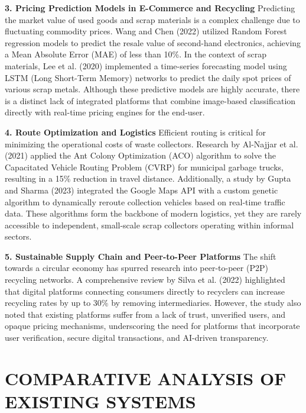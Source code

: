\textbf{3. Pricing Prediction Models in E-Commerce and Recycling}
Predicting the market value of used goods and scrap materials is a complex challenge due to fluctuating commodity prices. Wang and Chen (2022) utilized Random Forest regression models to predict the resale value of second-hand electronics, achieving a Mean Absolute Error (MAE) of less than 10\%. In the context of scrap materials, Lee et al. (2020) implemented a time-series forecasting model using LSTM (Long Short-Term Memory) networks to predict the daily spot prices of various scrap metals. Although these predictive models are highly accurate, there is a distinct lack of integrated platforms that combine image-based classification directly with real-time pricing engines for the end-user.

\textbf{4. Route Optimization and Logistics}
Efficient routing is critical for minimizing the operational costs of waste collectors. Research by Al-Najjar et al. (2021) applied the Ant Colony Optimization (ACO) algorithm to solve the Capacitated Vehicle Routing Problem (CVRP) for municipal garbage trucks, resulting in a 15\% reduction in travel distance. Additionally, a study by Gupta and Sharma (2023) integrated the Google Maps API with a custom genetic algorithm to dynamically reroute collection vehicles based on real-time traffic data. These algorithms form the backbone of modern logistics, yet they are rarely accessible to independent, small-scale scrap collectors operating within informal sectors.

\textbf{5. Sustainable Supply Chain and Peer-to-Peer Platforms}
The shift towards a circular economy has spurred research into peer-to-peer (P2P) recycling networks. A comprehensive review by Silva et al. (2022) highlighted that digital platforms connecting consumers directly to recyclers can increase recycling rates by up to 30\% by removing intermediaries. However, the study also noted that existing platforms suffer from a lack of trust, unverified users, and opaque pricing mechanisms, underscoring the need for platforms that incorporate user verification, secure digital transactions, and AI-driven transparency.

\section{COMPARATIVE ANALYSIS OF EXISTING SYSTEMS}

